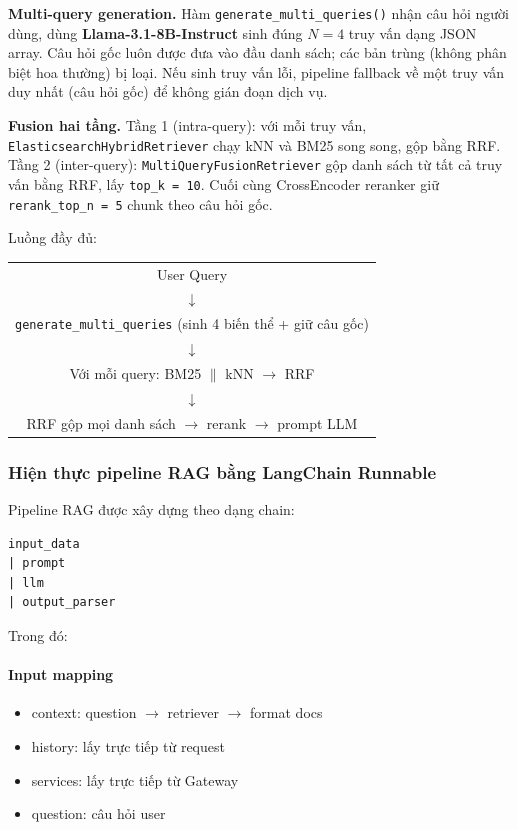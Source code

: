 \textbf{Multi-query generation.} Hàm \texttt{generate\_multi\_queries()} nhận câu hỏi người dùng, dùng \textbf{Llama-3.1-8B-Instruct} sinh đúng $N = 4$ truy vấn dạng JSON array. Câu hỏi gốc luôn được đưa vào đầu danh sách; các bản trùng (không phân biệt hoa thường) bị loại. Nếu sinh truy vấn lỗi, pipeline fallback về một truy vấn duy nhất (câu hỏi gốc) để không gián đoạn dịch vụ.

\textbf{Fusion hai tầng.} Tầng 1 (intra-query): với mỗi truy vấn, \texttt{ElasticsearchHybridRetriever} chạy kNN và BM25 song song, gộp bằng RRF. Tầng 2 (inter-query): \texttt{MultiQueryFusionRetriever} gộp danh sách từ tất cả truy vấn bằng RRF, lấy \texttt{top\_k = 10}. Cuối cùng CrossEncoder reranker giữ \texttt{rerank\_top\_n = 5} chunk theo câu hỏi gốc.

Luồng đầy đủ:
\begin{center}
\begin{tabular}{c}
User Query \\
$\downarrow$ \\
\texttt{generate\_multi\_queries} (sinh 4 biến thể + giữ câu gốc) \\
$\downarrow$ \\
Với mỗi query: BM25 $\parallel$ kNN $\rightarrow$ RRF \\
$\downarrow$ \\
RRF gộp mọi danh sách $\rightarrow$ rerank $\rightarrow$ prompt LLM \\
\end{tabular}
\end{center}

\subsubsection{Hiện thực pipeline RAG bằng LangChain Runnable}

Pipeline RAG được xây dựng theo dạng chain:

\begin{verbatim}
input_data
| prompt
| llm
| output_parser
\end{verbatim}

Trong đó:

\paragraph{Input mapping}

\begin{itemize}
    \item context: question $\rightarrow$ retriever $\rightarrow$ format docs
    \item history: lấy trực tiếp từ request
    \item services: lấy trực tiếp từ Gateway
    \item question: câu hỏi user
\end{itemize}

